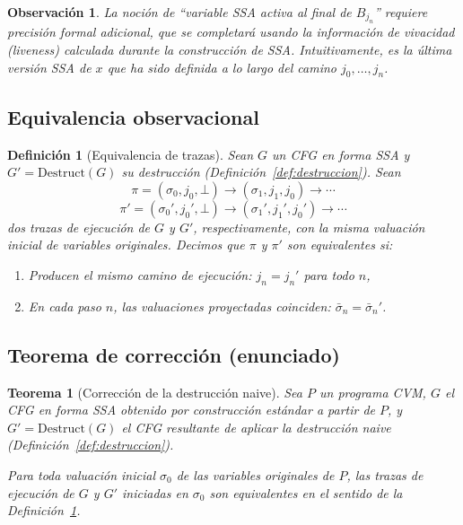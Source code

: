 \documentclass[12pt, a4paper]{article}
\newtheorem{definition}{Definición}[section]
\newtheorem{theorem}{Teorema}[section]
\newtheorem{remark}{Observación}[section]
\begin{document}
\begin{remark}
La noción de ``variable SSA activa al final de $B_{j_n}$'' requiere precisión formal adicional,
que se completará usando la información de vivacidad (\emph{liveness}) calculada durante la
construcción de SSA. Intuitivamente, es la última versión SSA de $x$ que ha sido definida a lo
largo del camino $j_0, \ldots, j_n$.
\end{remark}

\subsection{Equivalencia observacional}

\begin{definition}[Equivalencia de trazas]
\label{def:equiv-trazas}
Sean $G$ un CFG en forma SSA y $G' = \mathrm{Destruct}(G)$ su destrucción
(Definición~\ref{def:destruccion}). Sean
\[
  \pi  = (\sigma_0,  j_0,  \bot) \to (\sigma_1,  j_1,  j_0) \to \cdots
\]
\[
  \pi' = (\sigma_0', j_0', \bot) \to (\sigma_1', j_1', j_0') \to \cdots
\]
dos trazas de ejecución de $G$ y $G'$, respectivamente, con la misma valuación inicial de
variables originales. Decimos que $\pi$ y $\pi'$ son \emph{equivalentes} si:
\begin{enumerate}
  \item Producen el mismo camino de ejecución: $j_n = j_n'$ para todo $n$,
  \item En cada paso $n$, las valuaciones proyectadas coinciden:
    $\bar\sigma_n = \bar\sigma_n'$.
\end{enumerate}
\end{definition}

\subsection{Teorema de corrección (enunciado)}

\begin{theorem}[Corrección de la destrucción naive]
\label{thm:correctness}
Sea $P$ un programa CVM, $G$ el CFG en forma SSA obtenido por construcción estándar a partir
de $P$, y $G' = \mathrm{Destruct}(G)$ el CFG resultante de aplicar la destrucción naive
(Definición~\ref{def:destruccion}).

Para toda valuación inicial $\sigma_0$ de las variables originales de $P$, las trazas de
ejecución de $G$ y $G'$ iniciadas en $\sigma_0$ son equivalentes en el sentido de la
Definición~\ref{def:equiv-trazas}.
\end{theorem}
\end{document}
